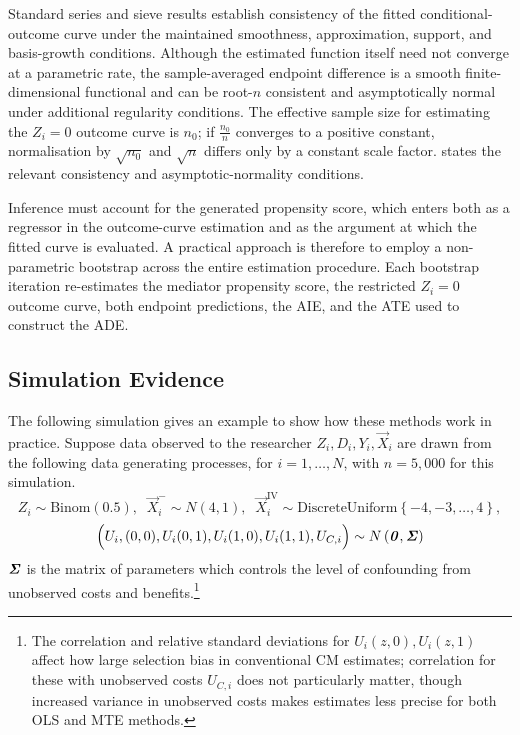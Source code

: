 Standard series and sieve results establish consistency of the fitted conditional-outcome curve under the maintained smoothness, approximation, support, and basis-growth conditions.
Although the estimated function itself need not converge at a parametric rate, the sample-averaged endpoint difference is a smooth finite-dimensional functional and can be root-$n$ consistent and asymptotically normal under additional regularity conditions.
The effective sample size for estimating the $Z_i=0$ outcome curve is $n_0$; if $\frac{n_0}{n}$ converges to a positive constant, normalisation by $\sqrt{n_0}$ and $\sqrt n$ differs only by a constant scale factor.
 states the relevant consistency and asymptotic-normality conditions.

Inference must account for the generated propensity score, which enters both as a regressor in the outcome-curve estimation and as the argument at which the fitted curve is evaluated.
A practical approach is therefore to employ a non-parametric bootstrap across the entire estimation procedure.
Each bootstrap iteration re-estimates the mediator propensity score, the restricted $Z_i=0$ outcome curve, both endpoint predictions, the AIE, and the ATE used to construct the ADE.

\subsection{Simulation Evidence}
\label{sec:simulations}
The following simulation gives an example to show how these methods work in practice.
Suppose data observed to the researcher $Z_i, D_i, Y_i, \vec X_i$ are drawn from the following data generating processes, for $i = 1, \hdots, N$, with 
$n = 5,000$ for this simulation.
\[ Z_i \sim \text{Binom}\left(0.5 \right),
    \;\; \vec X_i^- \sim N(4, 1),
    \;\; \vec X_i^{\text{IV}} \sim \text{DiscreteUniform}\left\{ -4, -3, \hdots, 4 \right\}, \]
\[ \Big( U_i,(0,0), U_i(0,1), U_i(1,0), U_i(1,1), U_{C,i} \Big) \sim
    N\left( \boldsymbol{\mathit{0}}, \boldsymbol{\mathit{\Sigma}} \right) \]
$\boldsymbol{\mathit{\Sigma}}$ is the matrix of parameters which controls the level of confounding from unobserved costs and benefits.\footnote{
    The correlation and relative standard deviations for $U_i(z,0), U_i(z,1)$ affect how large selection bias in conventional CM estimates; correlation for these with unobserved costs $U_{C,i}$ does not particularly matter, though increased variance in unobserved costs makes estimates less precise for both OLS and MTE methods.
}


